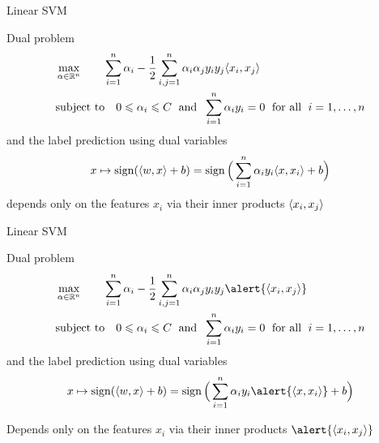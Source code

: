 \documentclass[xcolor={usenames,dvipsnames}]{beamer}
\begin{document}
\begin{frame}{Linear SVM}
  
\begin{block}{Dual problem}
  \begin{align*}
      &\max_{\alpha \in \mathbb{R}^n} \quad \quad \sum_{i=1}^n \alpha_i - \frac 12 \sum_{i, j=1}^n \alpha_i \alpha_j y_i y_j \langle x_i, x_j \rangle \\
    &\text{subject to} \quad 0 \leqslant \alpha_i \leqslant C \; \text{ and } \; 
    \sum_{i=1}^n \alpha_i y_i  = 0 \; \text{ for all } \; i=1, \ldots, n
  \end{align*}
  and the label prediction using dual variables
  \begin{equation*}
    x \mapsto \operatorname{sign}(\langle w, x \rangle + b) = \operatorname{sign}\Big(  \sum_{i=1}^n \alpha_i y_i 
    \langle x, x_i \rangle + b \Big)
  \end{equation*}
  depends only on the features $x_i$ via their inner products $\langle x_i, x_j \rangle$
  \end{block}
  
 \end{frame}
 \begin{frame}{Linear SVM}
  
\begin{block}{Dual problem}
  \begin{align*}
      &\max_{\alpha \in \R^n} \quad \quad \sum_{i=1}^n \alpha_i - \frac 12 \sum_{i, j=1}^n \alpha_i \alpha_j y_i y_j \alert{\inr{x_i, x_j}} \\
    &\text{subject to} \quad 0 \leq \alpha_i \leq C \; \text{ and } \; 
    \sum_{i=1}^n \alpha_i y_i  = 0 \; \text{ for all } \; i=1, \ldots, n
  \end{align*}
  and the label prediction using dual variables
  \begin{equation*}
    x \mapsto \sign(\inr{w, x} + b) = \sign\Big(  \sum_{i=1}^n \alpha_i y_i 
    \alert{\inr{x, x_i}} + b \Big)
  \end{equation*}
  \end{block}

\begin{alertblock}{}
  Depends only on the features $x_i$ via their inner products $\alert{\inr{x_i, x_j}}$
\end{alertblock}  
 \end{frame}
\end{document}
